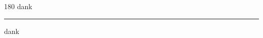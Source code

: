 
\begin{frame}
\begin{center}
\begin{turn}{180}
{\fontsize{2.5cm}{1em}\selectfont dank}
\end{turn}
\vspace{1em}\par  
\hrule
\vspace{1em}\par  
{\fontsize{2.5cm}{1em}\selectfont dank}
\end{center}
\end{frame}

